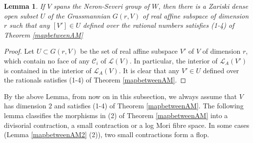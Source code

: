 \documentclass[11pt]{amsart}
\newtheorem{lem}[defn]{Lemma}
\begin{document}
\begin{lem}\label{subspace}
  \cite[Corollary 3.4]{haconSarkisovProgram2012} If $V$ spans the Neron-Severi group of $W$, then there is a Zariski dense open subset $U$ of the Grassmannian $G(r,V)$ of real affine subspace of dimension $r$ such that any  $[V']\in U$ defined over the rational numbers satisfies (1-4) of Theorem \ref{mapbetweenAM} 
\end{lem}

\begin{proof}
 Let $U \subset G(r,V) $ be the set of real affine subspace  $V'$ of $V$ of dimension $r$, which contain no face of any $\mathcal{C}_{i}$ of $\mathcal{L}(V)$. In particular, the interior of  $\mathcal{L}_{A}(V')$ is contained in the interior of $\mathcal{L}_{A}(V)$. It is clear that any $V'\in U$ defined over the rationals satisfies (1-4) of Theorem \ref{mapbetweenAM}. 
\end{proof}

By the above Lemma, from now on in this subsection, we always assume that $V$ has dimension $2$ and satisfies (1-4) of Theorem \ref{mapbetweenAM}. The following lemma classifies  the morphisms in (2) of Theorem \ref{mapbetweenAM} into a divisorial contraction, a small contraction or a log Mori fibre space. In some cases (Lemma \ref{mapbetweenAM2} (2)), two small contractions form a flop.
\end{document}
